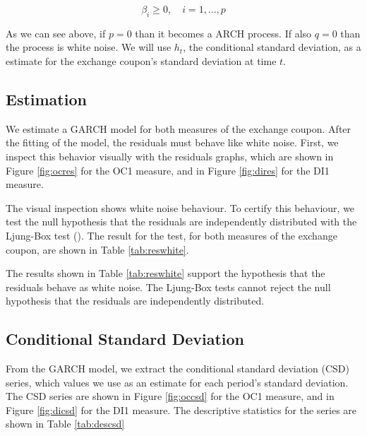 \documentclass[cic,tc, english]{iiufrgs}
\begin{document}
    $$\beta_i \geq 0, \quad  i=1,...,p$$

    As we can see above, if $p = 0$ than it becomes a ARCH process. If also $q = 0$ than the process is white noise. We will use $h_t$, the conditional standard deviation, as a estimate for the exchange coupon's standard deviation at time $t$.

\subsection{Estimation} \label{chapter_estimation}

    We estimate a GARCH model for both measures of the exchange coupon. After the fitting of the model, the residuals must behave like white noise. First, we inspect this behavior visually with the residuals graphs, which are shown in Figure \ref{fig:ocres} for the OC1 measure, and in Figure \ref{fig:dires} for the DI1 measure.

    

    

    The visual inspection shows white noise behaviour. To certify this behaviour, we test the null hypothesis that the residuals are independently distributed with the Ljung-Box test (\citet{ljungbox}). The result for the test, for both measures of the exchange coupon, are shown in Table \ref{tab:reswhite}.

    

    The results shown in Table \ref{tab:reswhite} support the hypothesis that the residuals behave as white noise. The Ljung-Box tests cannot reject the null hypothesis that the residuals are independently distributed.

\subsection{Conditional Standard Deviation}

    From the GARCH model, we extract the conditional standard deviation (CSD) series, which values we use as an estimate for each period's standard deviation. The CSD series are shown in Figure \ref{fig:occsd} for the OC1 measure, and in Figure \ref{fig:dicsd} for the DI1 measure. The descriptive statistics for the series are shown in Table \ref{tab:descsd}

    

    
\end{document}
